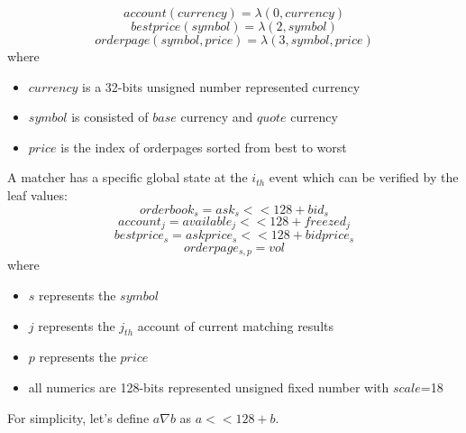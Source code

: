 \documentclass[a4paper,12pt]{article}
\begin{document}
\begin{equation*}
    account(currency) = \lambda(0, currency)
\end{equation*}
\begin{equation*}
    bestprice(symbol) = \lambda(2, symbol)
\end{equation*}
\begin{equation*}
    orderpage(symbol, price) = \lambda(3, symbol, price)
\end{equation*}
where\\
\begin{itemize}
    \item $currency$ is a 32-bits unsigned number represented currency
    \item $symbol$ is consisted of $base$ currency and $quote$ currency
    \item $price$ is the index of orderpages sorted from best to worst
\end{itemize}

A matcher has a specific global state at the \(i_{th}\) event which can be verified by the leaf values:\\
\begin{equation*}
    orderbook_{s} = ask_{s} << 128 + bid_{s}
\end{equation*}
\begin{equation*}
    account_{j} = available_{j} << 128 + freezed_{j}
\end{equation*}
\begin{equation*}
    bestprice_{s} = askprice_{s} << 128 + bidprice_{s}
\end{equation*}
\begin{equation*}
    orderpage_{s, p} = vol
\end{equation*}
where\\
\begin{itemize}
  \item $s$ represents the $symbol$
  \item $j$ represents the $j_{th}$ account of current matching results
  \item $p$ represents the $price$
  \item all numerics are 128-bits represented unsigned fixed number with $scale$=18
\end{itemize}

For simplicity, let's define \(a \nabla b\) as \(a << 128 + b\).
\end{document}
